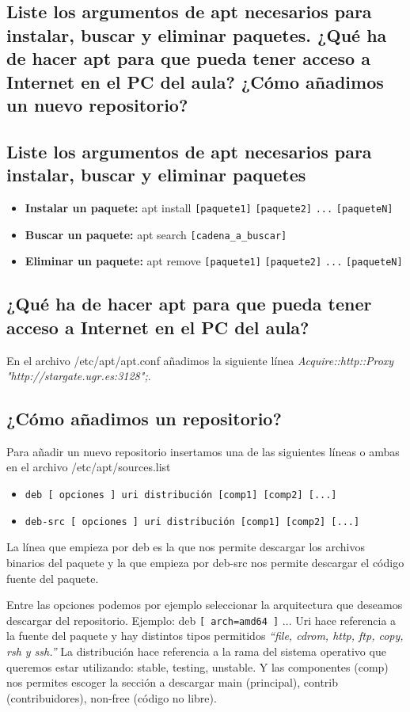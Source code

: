 \begin{flushleft}
\section{Liste los argumentos de apt necesarios para instalar, buscar y eliminar paquetes. ¿Qué ha de hacer apt para que pueda tener acceso a Internet en el PC del aula? ¿Cómo añadimos un nuevo repositorio?}

\subsection{Liste los argumentos de apt necesarios para instalar, buscar y eliminar paquetes}
\begin{itemize}
	\item \textbf{Instalar un paquete: } apt install \verb|[paquete1]| \verb|[paquete2]| \verb|...| \verb|[paqueteN]|
	\item \textbf{Buscar un paquete: } apt search \verb|[cadena_a_buscar]|
	\item \textbf{Eliminar un paquete: } apt remove \verb|[paquete1]| \verb|[paquete2]| \verb|...| \verb|[paqueteN]| \cite{c2a}
\end{itemize}
\subsection{¿Qué ha de hacer apt para que pueda tener acceso a Internet en el PC del aula?}
En el archivo /etc/apt/apt.conf añadimos la siguiente línea \textit{Acquire::http::Proxy "http://stargate.ugr.es:3128";}. \cite{c2b}
\subsection{¿Cómo añadimos un repositorio?}
Para añadir un nuevo repositorio insertamos una de las siguientes líneas o ambas en el archivo /etc/apt/sources.list \cite{c2c} 
\begin{itemize}
  \item \verb|deb [ opciones ] uri distribución [comp1] [comp2] [...]|
  \item \verb|deb-src [ opciones ] uri distribución [comp1] [comp2] [...]|
\end{itemize}
La línea que empieza por deb es la que nos permite descargar los archivos binarios del paquete y la que empieza por deb-src nos permite descargar el código fuente del paquete.

Entre las opciones podemos por ejemplo seleccionar la arquitectura que deseamos descargar del repositorio. Ejemplo: deb \verb|[ arch=amd64 ]| ...
\linebreak \linebreak
Uri hace referencia a la fuente del paquete y hay distintos tipos permitidos \textit{``file, cdrom, http, ftp, copy, rsh y ssh.''} La distribución hace referencia a la rama del sistema operativo que queremos estar utilizando: stable, testing, unstable. Y las componentes (comp) nos permites escoger la sección a descargar main (principal), contrib (contribuidores), non-free (código no libre).


\end{flushleft}
